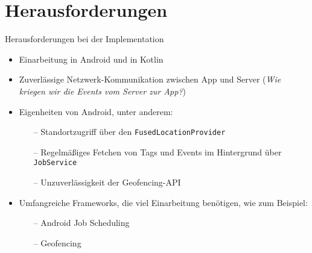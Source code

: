 \documentclass{beamer}
\begin{document}
	\section{Herausforderungen}
	\begin{frame}{Herausforderungen bei der Implementation}
		\begin{itemize}
			\item \alert<1>{Einarbeitung} in Android und in Kotlin
			\item Zuverlässige \alert<2>{Netzwerk-Kommunikation} zwischen App und Server (\textit{Wie kriegen wir die Events vom Server zur App?})
			\item \alert<3>{Eigenheiten} von Android, unter anderem:
				\begin{itemize}
					\item[--] Standortzugriff über den \texttt{FusedLocationProvider}
					\item[--] Regelmäßiges Fetchen von Tags und Events im Hintergrund über \texttt{JobService}
					\item[--] Unzuverlässigkeit der Geofencing-API
				\end{itemize}
			\item Umfangreiche \alert<4>{Frameworks}, die viel Einarbeitung benötigen, wie zum Beispiel:
				\begin{itemize}
					\item[--] Android Job Scheduling
					\item[--] Geofencing
				\end{itemize}
		\end{itemize}
	\end{frame}
	
\end{document}

